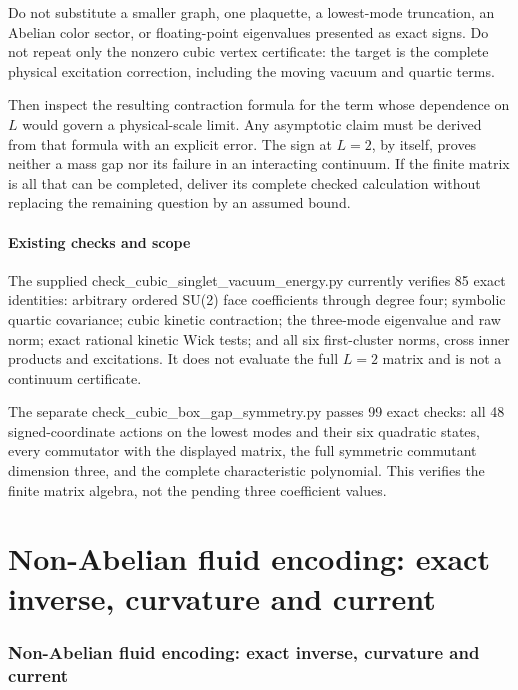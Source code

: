 \documentclass[
  11pt,
]{article}
\begin{document}
Do not substitute a smaller graph, one plaquette, a lowest-mode
truncation, an Abelian color sector, or floating-point eigenvalues
presented as exact signs. Do not repeat only the nonzero cubic vertex
certificate: the target is the complete physical excitation correction,
including the moving vacuum and quartic terms.

Then inspect the resulting contraction formula for the term whose
dependence on \(L\) would govern a physical-scale limit. Any asymptotic
claim must be derived from that formula with an explicit error. The sign
at \(L=2\), by itself, proves neither a mass gap nor its failure in an
interacting continuum. If the finite matrix is all that can be
completed, deliver its complete checked calculation without replacing
the remaining question by an assumed bound.

\subsection{Existing checks and scope}\label{weak-coupling-part-17-existing-checks-and-scope}

The supplied check\_cubic\_singlet\_vacuum\_energy.py currently verifies
85 exact identities: arbitrary ordered SU(2) face coefficients through
degree four; symbolic quartic covariance; cubic kinetic contraction; the
three-mode eigenvalue and raw norm; exact rational kinetic Wick tests;
and all six first-cluster norms, cross inner products and excitations.
It does not evaluate the full \(L=2\) matrix and is not a continuum
certificate.

The separate check\_cubic\_box\_gap\_symmetry.py passes 99 exact checks:
all 48 signed-coordinate actions on the lowest modes and their six
quadratic states, every commutator with the displayed matrix, the full
symmetric commutant dimension three, and the complete characteristic
polynomial. This verifies the finite matrix algebra, not the pending
three coefficient values.

\clearpage
\part{Non-Abelian fluid encoding: exact inverse, curvature and current}
\section{Non-Abelian fluid encoding: exact inverse, curvature and
current}\label{weak-coupling-part-18-non-abelian-fluid-encoding-exact-inverse-curvature-and-current}
\end{document}
